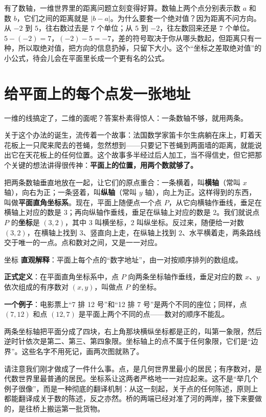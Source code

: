 有了数轴，一维世界里的距离问题立刻变得好算。数轴上两个点分别表示数 $a$ 和数 $b$，它们之间的距离就是 $\lvert b-a\rvert$。为什么要套一个绝对值？因为距离不问方向。从 $-2$ 到 $5$，往右数过去是 $7$ 个单位；从 $5$ 到 $-2$，往左数回来还是 $7$ 个单位。$5-(-2)=7$，$(-2)-5=-7$，差的符号取决于你从哪头数起，但距离只有一种，所以取绝对值，把方向的信息扔掉，只留下大小。这个“坐标之差取绝对值”的小公式，待会儿会在平面里长成一个更有名的公式。

\section{给平面上的每个点发一张地址}

一维的线搞定了，二维的面呢？答案朴素得惊人：一条数轴不够，就用两条。

关于这个办法的诞生，流传着一个故事：法国数学家笛卡尔生病躺在床上，盯着天花板上一只爬来爬去的苍蝇，忽然想到——只要记下苍蝇到两面墙的距离，就能说出它在天花板上的任何位置。这个故事多半经过后人加工，当不得信史，但它把那个关键的想法讲得很传神：\textbf{平面上的位置，用两个数就够了。}

把两条数轴垂直地放在一起，让它们的原点重合：一条横着，叫\textbf{横轴}（常叫 $x$ 轴），向右为正；一条竖着，叫\textbf{纵轴}（常叫 $y$ 轴），向上为正。这样得到的东西，叫做\textbf{平面直角坐标系}。现在，平面上随便点一个点 $P$，从它向横轴作垂线，垂足在横轴上对应的数是 $3$；再向纵轴作垂线，垂足在纵轴上对应的数是 $2$。我们就说点 $P$ 的\textbf{坐标}是 $(3,2)$，其中 $3$ 叫横坐标，$2$ 叫纵坐标。反过来，随便给一对数 $(3,2)$，在横轴上找到 $3$、竖直向上走，在纵轴上找到 $2$、水平横着走，两条路线交于唯一的一点。点和数对之间，又是一一对应。

\begin{shuyu}{坐标}
\textbf{直观解释}：平面上每个点的“数字地址”，由一对按顺序排列的数组成。

\textbf{正式定义}：在平面直角坐标系中，点 $P$ 向两条坐标轴作垂线，垂足对应的数 $x$、$y$ 依次组成的有序数对 $(x,y)$，叫做点 $P$ 的坐标。

\textbf{一个例子}：电影票上“7 排 12 号”和“12 排 7 号”是两个不同的座位；同样，点 $(7,12)$ 和点 $(12,7)$ 是平面上两个不同的点——数对的顺序不能乱。
\end{shuyu}

两条坐标轴把平面分成了四块，右上角那块横纵坐标都是正的，叫第一象限，然后逆时针依次是第二、第三、第四象限。坐标轴上的点不属于任何象限，它们是“边界”。这些名字不用死记，画两次图就熟了。

请注意我们刚才做成了一件什么事。点，是几何世界里最小的居民；有序数对，是代数世界里最普通的居民。坐标系让这两者严格地一一对应起来。这不是“举几个例子很像”，而是一种彻底的翻译机制：从这一刻起，关于点的任何陈述，原则上都能翻译成关于数的陈述，反之亦然。桥的两端已经对准了河的两岸，接下来要做的，是往桥上搬运第一批货物。

